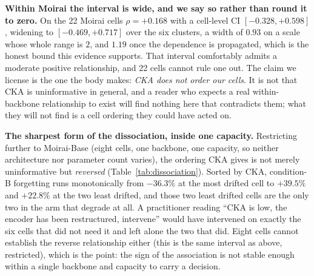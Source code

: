 \begin{table}[ht]
\centering\footnotesize
\caption{Is the pooled CKA correlation a backbone artefact? The same statistic
(Spearman $\rho$ of CKA against held-out B$-$D, $10{,}000$-resample bootstrap CI)
computed pooled and then stratified by backbone, at both resampling levels.
``Cl.'' is the number of $(\text{backbone}, \text{dataset})$ clusters, which is
the effective sample size for the clustered interval and is far below $n$. Values
are emitted by \texttt{scripts/clustered\_inference.py}. The pooled row is
reported for audit, not read as evidence; the two small arms carry essentially no
information at their cell counts, and for them the two levels coincide because
every cell is already its own cluster.}
\label{tab:crosscell}

\end{table}

\textbf{Within Moirai the interval is wide, and we say so rather than round it
to zero.} On the 22 Moirai cells $\rho{=}{+}0.168$ with a cell-level CI
$[-0.328, +0.598]$, widening to $[-0.469, +0.717]$ over the six clusters, a
width of $0.93$ on a scale whose whole range is $2$, and $1.19$ once the
dependence is propagated, which is the honest bound this evidence supports. That
interval comfortably
admits a moderate positive relationship, and 22 cells cannot rule one out. The
claim we license is the one the body makes: \emph{CKA does not order our
cells}. It is not that CKA is uninformative in general, and a reader who
expects a real within-backbone relationship to exist will find nothing here
that contradicts them; what they will not find is a cell ordering they could
have acted on.

\textbf{The sharpest form of the dissociation, inside one capacity.} Restricting
further to Moirai-Base (eight cells, one backbone, one capacity, so neither
architecture nor parameter count varies), the ordering CKA gives is not merely
uninformative but \emph{reversed} (Table~\ref{tab:dissociation}). Sorted by CKA,
condition-B forgetting runs monotonically from $-36.3\%$ at the most drifted cell
to $+39.5\%$ and $+22.8\%$ at the two least drifted, and those two least drifted
cells are the only two in the arm that degrade at all. A practitioner reading
``CKA is low, the encoder has been restructured, intervene'' would have
intervened on exactly the six cells that did not need it and left alone the two
that did. Eight cells cannot establish the reverse relationship either (this is
the same interval as above, restricted), which is the point: the sign of the
association is not stable enough within a single backbone and capacity to carry a
decision.

